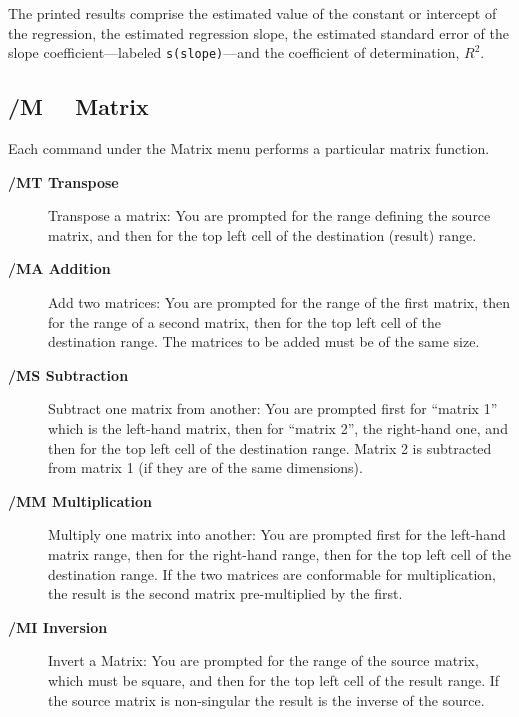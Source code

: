 \documentclass[titlepage]{article}
\begin{document}
The printed results comprise the estimated value of the constant or
intercept of the regression, the estimated regression slope, the
estimated standard error of the slope coefficient---labeled
\texttt{s(slope)}---and the coefficient of determination, $R^2$.

\subsection[Matrix Manipulation]{/M \ \      Matrix}

Each command under the Matrix menu performs a particular matrix
function.

\begin{description}
  
\item[{\bf /MT Transpose}]Transpose a matrix: You are prompted for the
  range defining the source matrix, and then for the top left cell of
  the destination (result) range.
  
\item[{\bf /MA Addition}]Add two matrices: You are prompted for the
  range of the first matrix, then for the range of a second matrix,
  then for the top left cell of the destination range.  The matrices
  to be added must be of the same size.
  
\item[{\bf /MS Subtraction}]Subtract one matrix from another: You are
  prompted first for ``matrix 1'' which is the left-hand matrix, then
  for ``matrix 2'', the right-hand one, and then for the top left cell
  of the destination range.  Matrix 2 is subtracted from matrix 1 (if
  they are of the same dimensions).
  
\item[{\bf /MM Multiplication}]Multiply one matrix into another: You
  are prompted first for the left-hand matrix range, then for the
  right-hand range, then for the top left cell of the destination
  range.  If the two matrices are conformable for multiplication, the
  result is the second matrix pre-multiplied by the first.
  
\item[{\bf /MI Inversion}]Invert a Matrix: You are prompted for the
  range of the source matrix, which must be square, and then for the
  top left cell of the result range.  If the source matrix is
  non-singular the result is the inverse of the source.

\end{description}
\end{document}

